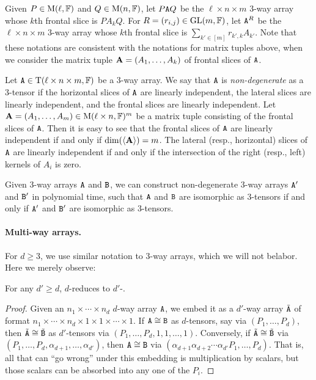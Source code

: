 \documentclass[11pt]{article}
\begin{document}
Given $P\in \mathrm{M}(\ell, \mathbb{F})$ and $Q\in \mathrm{M}(n, \mathbb{F})$, let 
$P\mathtt{A} Q$ be the $\ell \times 
n\times m$ $3$-way array whose $k$th frontal slice is $P A_k Q$. For 
$R=(r_{i,j})\in 
\mathrm{GL}(m, \mathbb{F})$, let $\mathtt{A}^R$ be the $\ell\times n\times m$ $3$-way array whose 
$k$th 
frontal slice is $\sum_{k'\in[m]}r_{k',k}A_{k'}$.  
Note that these notations are consistent with the notations for matrix 
tuples above, when we consider the matrix tuple $\mathbf{A} = (A_1, \dotsc, A_k)$ 
of frontal slices of $\mathtt{A}$.


Let $\mathtt{A}\in \mathrm{T}(\ell\times n\times m, \mathbb{F})$ be a 3-way array. We say that $\mathtt{A}$ is 
\emph{non-degenerate} as a 
3-tensor if 
the horizontal slices of $\mathtt{A}$ are linearly independent, the lateral slices are 
linearly independent, and the frontal slices are linearly independent. 
Let $\mathbf{A}=(A_1, 
\dots, A_m)\in \mathrm{M}(\ell\times n, \mathbb{F})^m$ be a matrix tuple consisting of the frontal 
slices of $\mathtt{A}$. Then it is easy to see that the frontal slices of $\mathtt{A}$ are 
linearly independent if and only if $\dim(\langle\mathbf{A}\rangle)=m$. The lateral 
(resp., horizontal) slices of $\mathtt{A}$ are linearly independent if and only if the 
intersection of the right (resp., left) kernels of $A_i$ is zero.
\begin{observation}\label{obs:nondeg}
Given $3$-way arrays $\mathtt{A}$ and $\mathtt{B}$, we can construct non-degenerate 
3-way arrays $\mathtt{A}'$ and $\mathtt{B}'$ in polynomial time, such that $\mathtt{A}$ and $\mathtt{B}$ are 
isomorphic as 
3-tensors if and only if $\mathtt{A}'$ and $\mathtt{B}'$ are isomorphic as 3-tensors.
\end{observation}

\paragraph{Multi-way arrays.} For $d \geq 3$, we use similar notation to 3-way arrays, which we will not belabor. Here we merely observe:

\begin{observation} \label{obs:d}
For any $d' \geq d$, $d$-\TI reduces to $d'$-\TI.
\end{observation}

\begin{proof}
Given an $n_1 \times \dotsb \times n_d$ $d$-way array $\mathtt{A}$, we embed it as a $d'$-way array $\tilde {\mathtt{A}}$ of format $n_1 \times \dotsb \times n_d \times 1 \times 1 \times \dotsb \times 1$. If $\mathtt{A} \cong \mathtt{B}$ as $d$-tensors, say via $(P_1, \dotsc, P_d)$, then $\tilde {\mathtt{A}} \cong \tilde {\mathtt{B}}$ as $d'$-tensors via $(P_1, \dotsc, P_d,1,1,\dotsc,1)$. Conversely, if $\tilde {\mathtt{A}} \cong \tilde {\mathtt{B}}$ via $(P_1,\dotsc, P_d,\alpha_{d+1},\dotsc,\alpha_{d'})$, then $\mathtt{A} \cong \mathtt{B}$ via $(\alpha_{d+1} \alpha_{d+2} \dotsb \alpha_{d'} P_1, \dotsc, P_d)$. That is, all that can ``go wrong'' under this embedding is multiplication by scalars, but those scalars can be absorbed into any one of the $P_i$.
\end{proof}
\end{document}
